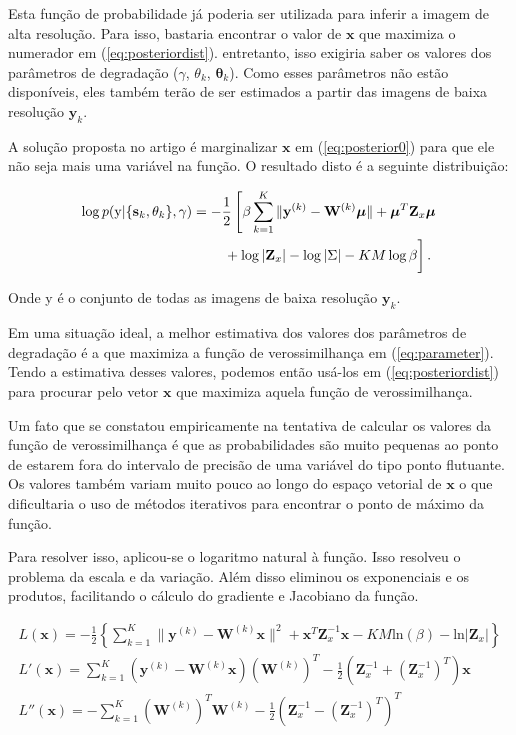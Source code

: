 \documentclass[12pt,openright,oneside,a4paper,english,brazil]{abntex2}
\begin{document}
Esta função de probabilidade já poderia ser utilizada para inferir a imagem de alta resolução.
Para isso, bastaria encontrar o valor de $\mathbf{x}$ que maximiza o numerador em (\ref{eq:posteriordist}). entretanto, isso exigiria saber os valores dos parâmetros de degradação ($\gamma$, $\theta_k$, $\mathbf{\theta}_k$).
Como esses parâmetros não estão disponíveis, eles também terão de ser estimados a partir das imagens de baixa resolução $\mathbf{y}_k$. 

A solução proposta no artigo é marginalizar $\mathbf{x}$ em (\ref{eq:posterior0}) para que ele não seja mais uma variável na função. O resultado disto é a seguinte distribuição:

\begin{align}
	\label{eq:parameter}
	\log p(\mathrm{y}|\{\mathbf{s}_k,\theta_k\}, \gamma) &= -\frac{1}{2}\left[\beta \sum^K_{k=1} \|\mathbf{y}^{(k)} - \mathbf{W}^{(k)}\boldsymbol{\mu}\|
    + \boldsymbol{\mu}^T\mathbf{Z}_x \boldsymbol{\mu} \right. \nonumber \\
    &\qquad \left.\vphantom{\int_t} + \log |\mathbf{Z}_x| - \log{|\Sigma |} - KM \log \beta \right].
\end{align}

Onde y é o conjunto de todas as imagens de baixa resolução $\mathbf{y}_k$.

Em uma situação ideal, a melhor estimativa dos valores dos parâmetros de degradação é a que maximiza a função de verossimilhança em (\ref{eq:parameter}).
Tendo a estimativa desses valores, podemos então usá-los em (\ref{eq:posteriordist}) para procurar pelo vetor $\mathbf{x}$ que maximiza aquela função de verossimilhança.

Um fato que se constatou empiricamente na tentativa de calcular os valores da função de verossimilhança é que as probabilidades são muito pequenas ao ponto de estarem fora do intervalo de precisão de uma variável do tipo ponto flutuante.
Os valores também variam muito pouco ao longo do espaço vetorial de $\mathbf{x}$ o que dificultaria o uso de métodos iterativos para encontrar o ponto de máximo da função.

Para resolver isso, aplicou-se o logaritmo natural à função. Isso resolveu o problema da escala e da variação.
Além disso eliminou os exponenciais e os produtos, facilitando o cálculo do gradiente e Jacobiano da função.

\begin{gather}
	L(\mathbf{x}) = -\frac{1}{2} \left\{ \sum^K_{k=1} \|\mathbf{y}^{(k)} - \mathbf{W}^{(k)} \mathbf{x} \|^2 + \mathbf{x}^T\mathbf{Z}^{-1}_x\mathbf{x} - KM\mathrm{ln}(\beta) - \mathrm{ln}|\mathbf{Z}_x| \right\} \\ 
	L'(\mathbf{x}) =  \sum^K_{k=1}  (\mathbf{y}^{(k)} - \mathbf{W}^{(k)}\mathbf{x})(\mathbf{W}^{(k)})^T  - \frac{1}{2}(\mathbf{Z}^{-1}_x + (\mathbf{Z}^{-1}_x)^T)\mathbf{x}  \\
	L''(\mathbf{x}) =  -\sum^K_{k=1} (\mathbf{W}^{(k)})^T\mathbf{W}^{(k)} - \frac{1}{2}(\mathbf{Z}^{-1}_x - (\mathbf{Z}^{-1}_x)^T)^T
\end{gather}
\end{document}
